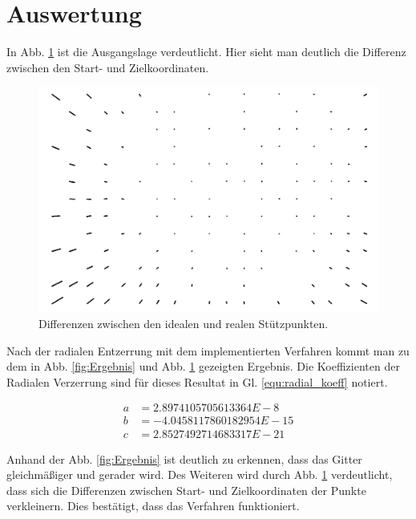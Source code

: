 
\section{Auswertung}

In Abb. \ref{fig:diffsResult} ist die Ausgangslage verdeutlicht. Hier sieht man deutlich die Differenz zwischen den Start- und Zielkoordinaten. 

\begin{figure}[H]
	\includegraphics[width=\textwidth]{Images/Auswertung/Testbild1/SourceImage with PointPairs_onlydiffs.jpg}
	\caption{Differenzen zwischen den idealen und realen Stützpunkten.}
	\label{fig:diffsResult}
\end{figure}

Nach der radialen Entzerrung mit dem implementierten Verfahren kommt man zu dem in Abb. \ref{fig:Ergebnis} und Abb. \ref{fig:diffsResult} gezeigten Ergebnis. Die Koeffizienten der Radialen Verzerrung sind für dieses Resultat in Gl. \ref{equ:radial_koeff} notiert. 

\begin{align}
a &=  2.8974105705613364E-8 \nonumber \\
b &= -4.0458117860182954E-15 \nonumber \\
c &=  2.8527492714683317E-21
\label{equ:radial_koeff}
\end{align}

Anhand der Abb. \ref{fig:Ergebnis} ist deutlich zu erkennen, dass das Gitter gleichmäßiger und gerader wird. Des Weiteren wird durch Abb. \ref{fig:diffsResult} verdeutlicht, dass sich die Differenzen zwischen Start- und Zielkoordinaten der Punkte verkleinern. Dies bestätigt, dass das Verfahren funktioniert.

